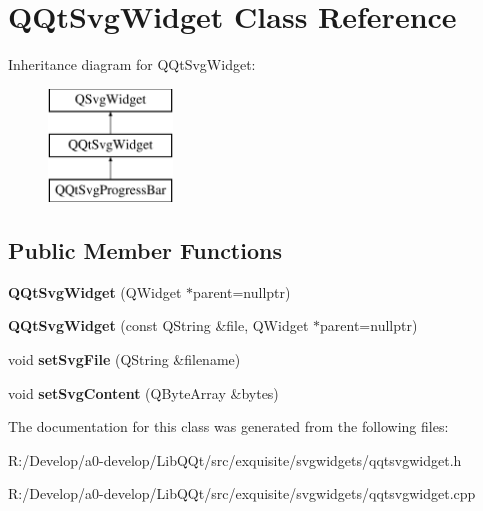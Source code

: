 \hypertarget{class_q_qt_svg_widget}{}\section{Q\+Qt\+Svg\+Widget Class Reference}
\label{class_q_qt_svg_widget}
Inheritance diagram for Q\+Qt\+Svg\+Widget\+:\begin{figure}[H]
\begin{center}
\leavevmode
\includegraphics[height=3.000000cm]{class_q_qt_svg_widget}
\end{center}
\end{figure}
\subsection*{Public Member Functions}
\begin{DoxyCompactItemize}
\item 
\mbox{\label{class_q_qt_svg_widget_afd5be4fd2cc08e63b91786d6b2862eeb}} 
{\bfseries Q\+Qt\+Svg\+Widget} (Q\+Widget $\ast$parent=nullptr)
\item 
\mbox{\label{class_q_qt_svg_widget_abb8be965bd623ada4f3040d823a7e0bf}} 
{\bfseries Q\+Qt\+Svg\+Widget} (const Q\+String \&file, Q\+Widget $\ast$parent=nullptr)
\item 
\mbox{\label{class_q_qt_svg_widget_a342268a6df2008028125b92f97884e5b}} 
void {\bfseries set\+Svg\+File} (Q\+String \&filename)
\item 
\mbox{\label{class_q_qt_svg_widget_ad88441613628838ac4547c7f493eb1ab}} 
void {\bfseries set\+Svg\+Content} (Q\+Byte\+Array \&bytes)
\end{DoxyCompactItemize}


The documentation for this class was generated from the following files\+:\begin{DoxyCompactItemize}
\item 
R\+:/\+Develop/a0-\/develop/\+Lib\+Q\+Qt/src/exquisite/svgwidgets/qqtsvgwidget.\+h\item 
R\+:/\+Develop/a0-\/develop/\+Lib\+Q\+Qt/src/exquisite/svgwidgets/qqtsvgwidget.\+cpp\end{DoxyCompactItemize}
